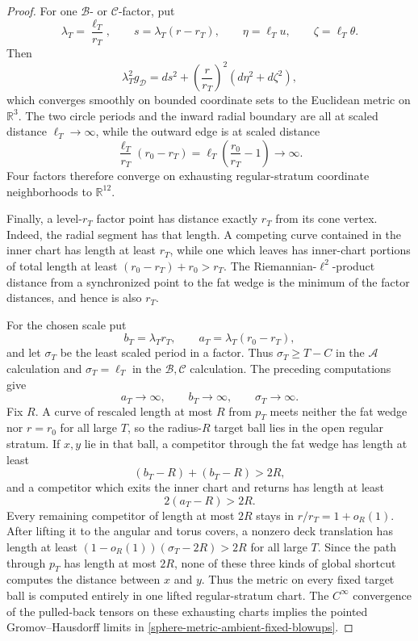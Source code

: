 \begin{proof}
For one \(\mathcal B\)- or \(\mathcal C\)-factor, put
\[
 \lambda_T=\frac{\ell_T}{r_T},\qquad
 s=\lambda_T(r-r_T),\qquad
 \eta=\ell_Tu,\qquad \zeta=\ell_T\theta.
\]
Then
\[
 \lambda_T^2g_{\mathcal D}
 =ds^2+\left(\frac r{r_T}\right)^2
       (d\eta^2+d\zeta^2),
\]
which converges smoothly on bounded coordinate sets to the Euclidean metric
on \(\mathbb R^3\).  The two circle periods and the inward radial boundary
are all at scaled distance \(\ell_T\to\infty\), while the outward edge is
at scaled distance
\[
 \frac{\ell_T}{r_T}(r_0-r_T)
 =\ell_T\left(\frac{r_0}{r_T}-1\right)\longrightarrow\infty.
\]
Four factors therefore converge on exhausting regular-stratum coordinate
neighborhoods to \(\mathbb R^{12}\).

Finally, a level-\(r_T\) factor point has distance exactly \(r_T\) from its
cone vertex.  Indeed, the radial segment has that length.  A competing
curve contained in the inner chart has length at least \(r_T\), while one
which leaves has inner-chart portions of total length at least
\((r_0-r_T)+r_0>r_T\).  The Riemannian-\(\ell^2\)-product distance from a
synchronized point to the fat wedge is the minimum of the factor
distances, and hence is also \(r_T\).

For the chosen scale put
\[
 b_T=\lambda_Tr_T,\qquad a_T=\lambda_T(r_0-r_T),
\]
and let \(\sigma_T\) be the least scaled period in a factor.  Thus
\(\sigma_T\geq T-C\) in the \(\mathcal A\) calculation and
\(\sigma_T=\ell_T\) in the \(\mathcal B,\mathcal C\) calculation.  The
preceding computations give
\[
 a_T\longrightarrow\infty,\qquad
 b_T\longrightarrow\infty,\qquad
 \sigma_T\longrightarrow\infty.
\]
Fix \(R\).  A curve of rescaled length at most \(R\) from \(p_T\) meets
neither the fat wedge nor \(r=r_0\) for all large \(T\), so the
radius-\(R\) target ball lies in the open regular stratum.  If \(x,y\) lie
in that ball, a competitor through the fat wedge has length at least
\[
 (b_T-R)+(b_T-R)>2R,
\]
and a competitor which exits the inner chart and returns has length at
least
\[
 2(a_T-R)>2R.
\]
Every remaining competitor of length at most \(2R\) stays in
\(r/r_T=1+o_R(1)\).  After lifting it to the angular and torus covers, a
nonzero deck translation has length at least
\((1-o_R(1))(\sigma_T-2R)>2R\) for all large \(T\).  Since the path through
\(p_T\) has length at most \(2R\), none of these three kinds of global
shortcut computes the distance between \(x\) and \(y\).  Thus the metric
on every fixed target ball is computed entirely in one lifted
regular-stratum chart.  The \(C^\infty\) convergence of the pulled-back
tensors on these exhausting charts implies the pointed
Gromov--Hausdorff limits in
\eqref{sphere-metric-ambient-fixed-blowups}.
\end{proof}

